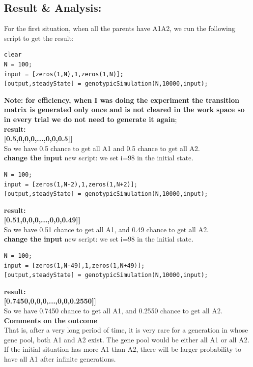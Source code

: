\documentclass[twoside]{article}
\begin{document}
\subsection{\normalsize{Result \& Analysis:}}
For the first situation, when all the parents have A1A2, we run the following script to get the result:
\begin{lstlisting}
clear
N = 100;
input = [zeros(1,N),1,zeros(1,N)];
[output,steadyState] = genotypicSimulation(N,10000,input);
\end{lstlisting}
\noindent \textbf {Note: for efficiency, when I was doing the experiment the transition matrix is generated only once and is not cleared in the work space so in every trial we do not need to generate it again};\\
\noindent \textbf {result:}\\
\noindent \textbf {[0.5,0,0,0,...,0,0,0.5]]}\\
So we have 0.5 chance to get all A1 and 0.5 chance to get all A2.\\
\noindent \textbf {change the input}
new script: we set i=98 in the initial state.
\begin{lstlisting}
N = 100;
input = [zeros(1,N-2),1,zeros(1,N+2)];
[output,steadyState] = genotypicSimulation(N,10000,input);
\end{lstlisting}
\noindent \textbf {result:}\\
\noindent \textbf {[0.51,0,0,0,...,0,0,0.49]]}\\
So we have 0.51 chance to get all A1, and 0.49 chance to get all A2.\\
\noindent \textbf {change the input}
new script: we set i=98 in the initial state.
\begin{lstlisting}
N = 100;
input = [zeros(1,N-49),1,zeros(1,N+49)];
[output,steadyState] = genotypicSimulation(N,10000,input);
\end{lstlisting}
\noindent \textbf {result:}\\
\noindent \textbf {[0.7450,0,0,0,...,0,0,0.2550]]}\\
So we have 0.7450 chance to get all A1, and 0.2550 chance to get all A2.\\
\noindent \textbf {Comments on the outcome}\\
That is, after a very long period of time, it is very rare for a generation in whose gene pool, both A1 and A2 exist. The gene pool would be either all A1 or all A2. If the initial situation has more A1 than A2, there will be larger probability to have all A1 after infinite generations.\\
\end{document}
